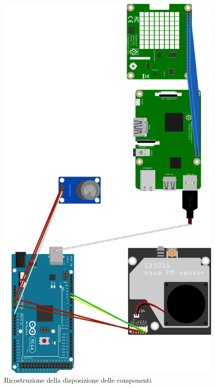 \documentclass[12pt, a4paper]{article}
\begin{document}
	\begin{figure}[H]
		\centering
		\includegraphics[height=0.95\textheight]{board.png}
		\caption{Ricostruzione della disposizione delle componenti}
		\label{fig:board}
	\end{figure}
	\clearpage
\end{document}
